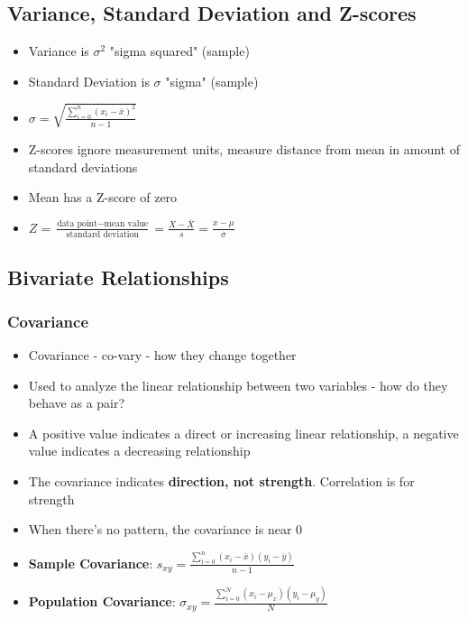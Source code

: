 \documentclass{article}
\begin{document}
\subsection{Variance, Standard Deviation and Z-scores}

\begin{itemize}
    \item Variance is $\sigma^2$ "sigma squared" (sample)
    \item Standard Deviation is $\sigma$ "sigma" (sample)
    \item $\sigma = \sqrt{\frac{\sum_{i=0}^{n}{(x_i-\bar{x})^2}}{n-1}}$
\end{itemize}

\begin{itemize}
    \item Z-scores ignore measurement units, measure distance from mean in amount of standard deviations
    \item Mean has a Z-score of zero
    \item $Z = \frac{\text{data point} - \text{mean value}}{\text{standard deviation}}=\frac{X-\bar{X}}{s}=\frac{x-\mu}{\sigma}$
\end{itemize}

\subsection{Bivariate Relationships}

\subsubsection{Covariance}

\begin{itemize}
    \item Covariance - co-vary - how they change together
    \item Used to analyze the linear relationship between two variables - how do they behave as a pair?
    \item A positive value indicates a direct or increasing linear relationship, a negative value indicates a decreasing relationship
    \item The covariance indicates \textbf{direction, not strength}. Correlation is for strength
    \item When there's no pattern, the covariance is near 0
    \item \textbf{Sample Covariance}: $s_{xy}=\frac{\sum_{i=0}^n{(x_i-\bar{x})(y_i-\bar{y})}}{n-1}$
    \item \textbf{Population Covariance}: $\sigma_{xy}=\frac{\sum_{i=0}^N{(x_i-\mu_x)(y_i-\mu_y)}}{N}$
\end{itemize}
\end{document}
